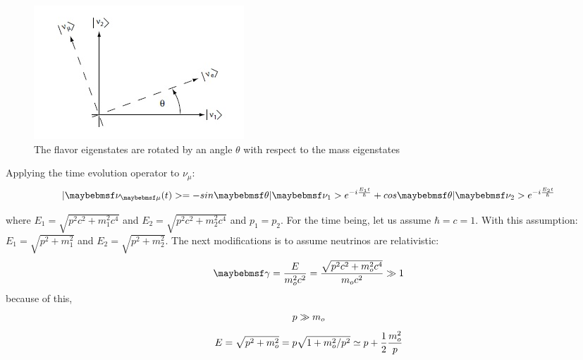 \begin{figure}[htp]
\centering
\includegraphics[scale=.8]{figs/mixingangle.jpg}
\caption{The flavor eigenstates are rotated by an angle $\theta$ with respect to the mass eigenstates}
\label{fig:mixing}
\end{figure}

Applying the time evolution operator to $\nu_{\mu}$:
\begin{equation}
\centering
\label{eq:timeevol}
|\nu_{\mu}(t)> = -sin\theta|\nu_{1}>e^{-i\frac{E_{1}t}{\hbar}} + cos\theta|\nu_{2}>e^{-i\frac{E_{2}t}{\hbar}}
\end{equation}

where $E_{1} = \sqrt{p^2 c^2 + m^2_{1} c^4}$ and $E_{2} = \sqrt{p^2 c^2 + m^2_{2} c^4}$ and $p_{1}=p_{2}$. For the time being, let us assume $\hbar=c=1$. 
With this assumption:
$E_{1}=\sqrt{p^2+m^2_{1}}$ and $E_{2} = \sqrt{p^2 + m^2_{2}}$.
The next modifications is to assume neutrinos are relativistic:
\begin{equation}
\centering
\label{eq:gamma}
\gamma = \frac{E}{m^2_{o} c^2} = \frac{\sqrt{p^2 c^2 + m^2_{o} c^4}}{m_{o} c^2} \gg 1
\end{equation}
because of this,
\begin{equation}
\centering
p \gg m_{o}
\end{equation}
\begin{equation}
\centering
E = \sqrt{p^2 + m^2_{o}}=p\sqrt{1+m^2_{o}/p^2}\simeq p + \frac{1}{2}\frac{m^2_{o}}{p}
\end{equation}

